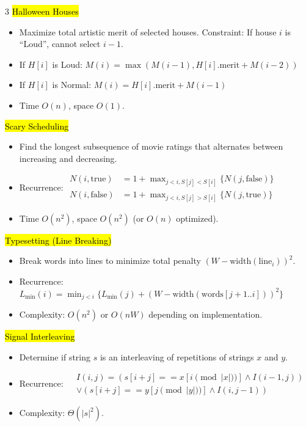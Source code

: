 \documentclass[letterpaper]{article}
\begin{document}
\begin{multicols*}{3}
    \hl{Halloween Houses}
    \begin{itemize}
        \item Maximize total artistic merit of selected houses. Constraint: If house $i$ is “Loud”, cannot select $i-1$.
        \item If $H[i]$ is Loud:
              $
                  M(i) = \max(M(i-1), H[i].\text{merit} + M(i-2))
              $
        \item If $H[i]$ is Normal:
              $
                  M(i) = H[i].\text{merit} + M(i-1)
              $
        \item Time $O(n)$, space $O(1)$.
    \end{itemize}

    \hl{Scary Scheduling}
    \begin{itemize}
        \item Find the longest subsequence of movie ratings that alternates between increasing and decreasing.
        \item Recurrence:
              $
                  \begin{aligned}
                      N(i,\text{true})  & = 1 + \max_{j<i, S[j]<S[i]} \{N(j,\text{false})\} \\
                      N(i,\text{false}) & = 1 + \max_{j<i, S[j]>S[i]} \{N(j,\text{true})\}
                  \end{aligned}
              $
        \item Time $O(n^2)$, space $O(n^2)$ (or $O(n)$ optimized).
    \end{itemize}

    \hl{Typesetting (Line Breaking)}
    \begin{itemize}
        \item Break words into lines to minimize total penalty $(W-\text{width}(\text{line}_i))^2$.
        \item Recurrence:
              $
                  L_{\min}(i) = \min_{j<i} \{ L_{\min}(j) + (W - \text{width}(\text{words}[j+1..i]))^2 \}
              $
        \item Complexity: $O(n^2)$ or $O(nW)$ depending on implementation.
    \end{itemize}

    \hl{Signal Interleaving}
    \begin{itemize}
        \item Determine if string $s$ is an interleaving of repetitions of strings $x$ and $y$.
        \item Recurrence:
              $\begin{aligned}&I(i,j)=(s[i+j]==x[i\pmod{|x|})]\wedge I(i-1,j))\\&\vee(s[i+j]==y[j\pmod{|y|})]\wedge I(i,j-1))\end{aligned}$
        \item Complexity: $\Theta(|s|^2)$.
    \end{itemize}



\end{multicols*}
\end{document}
